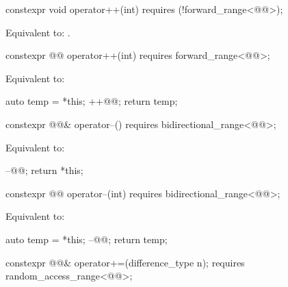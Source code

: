 %
\begin{itemdecl}
constexpr void operator++(int) requires (!forward_range<@@>);
\end{itemdecl}

\begin{itemdescr}
\pnum
\effects
Equivalent to: .
\end{itemdescr}

%
\begin{itemdecl}
constexpr @@ operator++(int) requires forward_range<@@>;
\end{itemdecl}

\begin{itemdescr}
\pnum
\effects
Equivalent to:
\begin{codeblock}
auto temp = *this;
++@@;
return temp;
\end{codeblock}
\end{itemdescr}

%
\begin{itemdecl}
constexpr @@& operator--() requires bidirectional_range<@@>;
\end{itemdecl}

\begin{itemdescr}
\pnum
\effects
Equivalent to:
\begin{codeblock}
--@@;
return *this;
\end{codeblock}
\end{itemdescr}

%
\begin{itemdecl}
constexpr @@ operator--(int) requires bidirectional_range<@@>;
\end{itemdecl}

\begin{itemdescr}
\pnum
\effects
Equivalent to:
\begin{codeblock}
auto temp = *this;
--@@;
return temp;
\end{codeblock}
\end{itemdescr}

%
\begin{itemdecl}
constexpr @@& operator+=(difference_type n);
  requires random_access_range<@@>;
\end{itemdecl}

